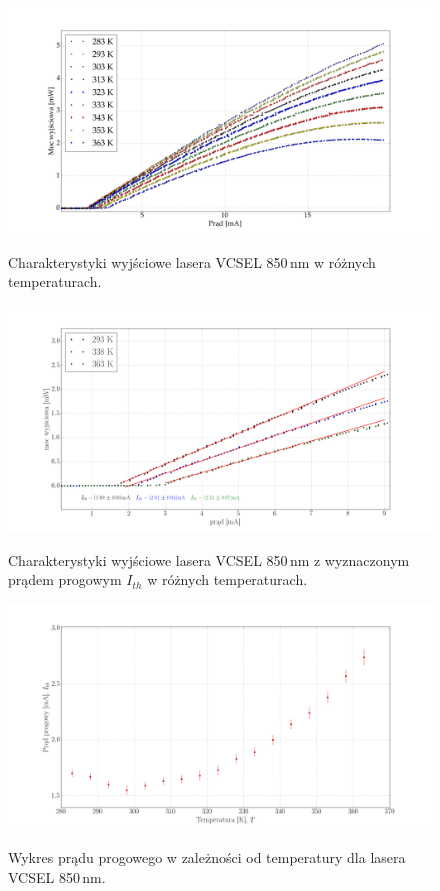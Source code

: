 \documentclass[a4paper, portrait,12pt]{report}
\begin{document}
\begin{figure}
\center
  \includegraphics[scale=0.30]{plot_vcsel850/plot_all.png}
  \label{rys1}
  \caption{Charakterystyki wyjściowe lasera VCSEL 850\,nm w różnych temperaturach.} 
\end{figure}
\begin{figure}
\center
  \includegraphics[scale=0.30]{plot_vcsel850/plot_3_i_th.png}
  \label{rys1}
  \caption{Charakterystyki wyjściowe lasera VCSEL 850\,nm z wyznaczonym prądem progowym $I_{th}$ w różnych temperaturach.} 
\end{figure}
\begin{figure}
\center
  \includegraphics[scale=0.30]{plot_vcsel850/plot_lin_i_th.png}
  \label{rys1}
  \caption{Wykres prądu progowego w zależności od temperatury dla lasera VCSEL 850\,nm.} 
\end{figure}
\end{document}
